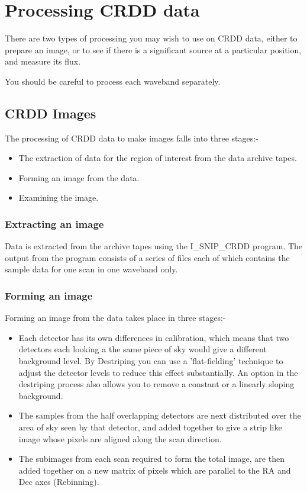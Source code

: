 \documentclass[nolof,noabs,11pt]{starlink}
\begin{document}
\section {Processing CRDD data}

There are two types of processing you may wish to use on CRDD data, either to
prepare an image, or to see if there is a significant source at a particular
position, and measure its flux.

You should be careful to process each waveband separately.

\subsection{CRDD Images}

The processing of CRDD data to make images falls into three stages:-
\begin{itemize}
\item The extraction of data for the region of interest from the data archive
tapes.
\item Forming an image from the data.
\item Examining the image.
\end{itemize}

\subsubsection{Extracting an image}

Data is extracted from the archive tapes using the I\_SNIP\_CRDD program.
The output from the program consists of a series of files each of which
contains the sample data for one scan in one waveband only.

\subsubsection{Forming an image}

Forming an image from the data takes place in three stages:-
\begin{itemize}
\item Each detector has its own differences in calibration, which means that two
detectors each looking a the same piece of sky would give a different background
level. By Destriping you can use a 'flat-fielding' technique  to adjust the
detector levels to reduce this effect substantially. An option in the
destriping process also allows you to remove a constant or a linearly sloping
background.
\item The samples from the half overlapping detectors are next distributed over
the area of sky seen by that detector, and added together to give a strip
like image whose pixels are aligned along the scan direction.
\item The subimages from each scan required to form the total image, are then
added together on a new matrix of pixels which are parallel to the RA and Dec
axes (Rebinning).
\end{itemize}
\end{document}
